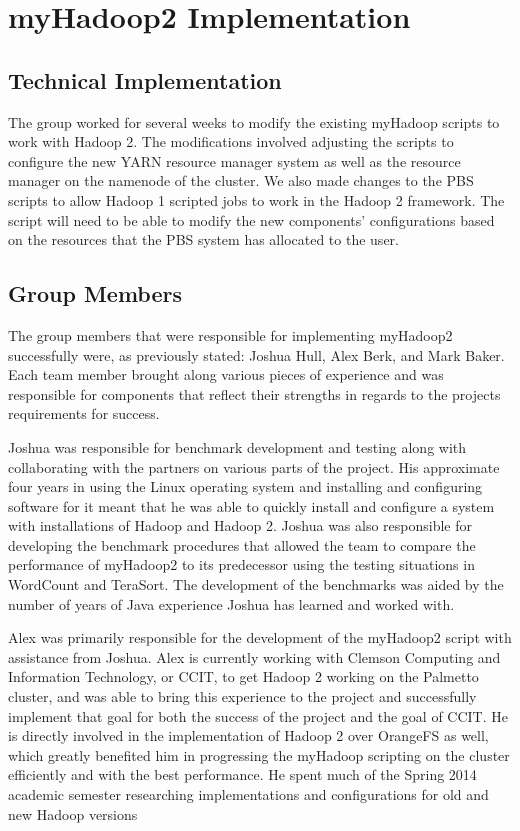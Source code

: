 \documentclass[conference]{IEEEtran}
\begin{document}
	\section{myHadoop2 Implementation}
		\subsection{Technical Implementation}
			The group worked for several weeks to modify the existing myHadoop scripts to work with Hadoop 2. The modifications involved adjusting the scripts to configure the new YARN resource manager system as well as the resource manager on the namenode of the cluster. We also made changes to the PBS scripts to allow Hadoop 1 scripted jobs to work in the Hadoop 2 framework. The script will need to be able to modify the new components’ configurations based on the resources that the PBS system has allocated to the user.

		\subsection{Group Members}
			The group members that were responsible for implementing myHadoop2 successfully were, as previously stated: Joshua Hull, Alex Berk, and Mark Baker. Each team member brought along various pieces of experience and was responsible for components that reflect their strengths in regards to the projects requirements for success. 

			Joshua was responsible for benchmark development and testing along with collaborating with the partners on various parts of the project. His approximate four years in using the Linux operating system and installing and configuring software for it meant that he was able to quickly install and configure a system with installations of Hadoop and Hadoop 2. Joshua was also responsible for developing the benchmark procedures that allowed the team to compare the performance of myHadoop2 to its predecessor using the testing situations in WordCount and TeraSort. The development of the benchmarks was aided by the number of years of Java experience Joshua has learned and worked with.

			Alex was primarily responsible for the development of the myHadoop2 script with assistance from Joshua. Alex is currently working with Clemson Computing and Information Technology, or CCIT, to get Hadoop 2 working on the Palmetto cluster, and was able to bring this experience to the project and successfully implement that goal for both the success of the project and the goal of CCIT. He is directly involved in the implementation of Hadoop 2 over OrangeFS as well, which greatly benefited him in progressing the myHadoop scripting on the cluster efficiently and with the best performance. He spent much of the Spring 2014 academic semester researching implementations and configurations for old and new Hadoop versions\cite{hadoopguide}\cite{hadoopyarn}
\end{document}
